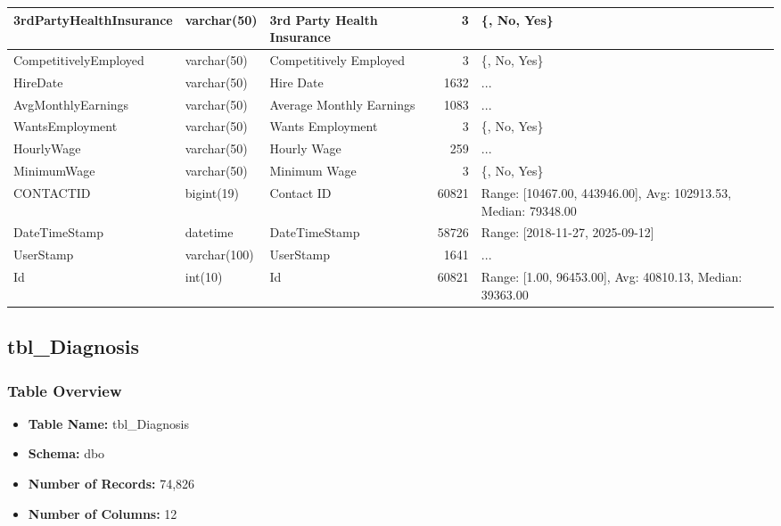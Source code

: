 \begin{landscape}
\begin{longtable}{|l|l|l|r|p{6cm}|}
\hline
3rdPartyHealthInsurance & varchar(50) & 3rd Party Health Insurance & 3 & \{, No, Yes\} \\
\hline
CompetitivelyEmployed & varchar(50) & Competitively Employed & 3 & \{, No, Yes\} \\
\hline
HireDate & varchar(50) & Hire Date & 1632 & ... \\
\hline
AvgMonthlyEarnings & varchar(50) & Average Monthly Earnings & 1083 & ... \\
\hline
WantsEmployment & varchar(50) & Wants Employment & 3 & \{, No, Yes\} \\
\hline
HourlyWage & varchar(50) & Hourly Wage & 259 & ... \\
\hline
MinimumWage & varchar(50) & Minimum Wage & 3 & \{, No, Yes\} \\
\hline
CONTACTID & bigint(19) & Contact ID & 60821 & Range: [10467.00, 443946.00], Avg: 102913.53, Median: 79348.00 \\
\hline
DateTimeStamp & datetime & DateTimeStamp & 58726 & Range: [2018-11-27, 2025-09-12] \\
\hline
UserStamp & varchar(100) & UserStamp & 1641 & ... \\
\hline
Id & int(10) & Id & 60821 & Range: [1.00, 96453.00], Avg: 40810.13, Median: 39363.00 \\
\hline
\end{longtable}

\subsection{tbl\_Diagnosis}

\subsubsection{Table Overview}
\begin{itemize}
\item \textbf{Table Name:} tbl\_Diagnosis
\item \textbf{Schema:} dbo
\item \textbf{Number of Records:} 74,826
\item \textbf{Number of Columns:} 12
\end{itemize}


\end{landscape}
